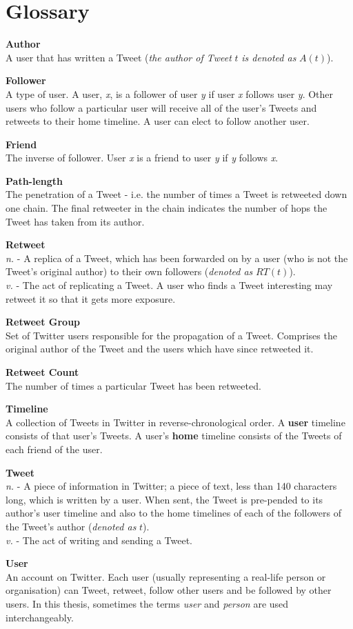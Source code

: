 \chapter*{Glossary} 

{\bf Author}\\
A user that has written a Tweet  (\textit{the author of Tweet} $t$ \textit{is denoted as} $A(t)$). 

{\bf Follower}\\
A type of user. A user, \textit{x}, is a follower of user \textit{y} if user \textit{x} follows user \textit{y}. Other users who follow a particular user will receive all of the user's Tweets and retweets to their home timeline. A user can elect to follow another user.

{\bf Friend}\\
The inverse of follower. User \textit{x} is a friend to user \textit{y} if \textit{y} follows \textit{x}.

{\bf Path-length}\\
The penetration of a Tweet - i.e. the number of times a Tweet is retweeted down one chain. The final retweeter in the chain indicates the number of hops the Tweet has taken from its author.
			
{\bf Retweet}\\
\textit{n.} - A replica of a Tweet, which has been forwarded on by a user (who is not the Tweet's original author) to their own followers (\textit{denoted as} $RT(t)$). \\
\textit{v.} - The act of replicating a Tweet. A user who finds a Tweet interesting may retweet it so that it gets more exposure.
									
{\bf Retweet Group}\\
Set of Twitter users responsible for the propagation of a Tweet. Comprises the original author of the Tweet and the users which have since retweeted it.

{\bf Retweet Count}\\
The number of times a particular Tweet has been retweeted.

{\bf Timeline}\\
A collection of Tweets in Twitter in reverse-chronological order. A \textbf{user} timeline consists of that user's Tweets. A user's \textbf{home} timeline consists of the Tweets of each friend of the user.

{\bf Tweet}\\
\textit{n.} - A piece of information in Twitter; a piece of text, less than 140 characters long, which is written by a user. When sent, the Tweet is pre-pended to its author's user timeline and also to the home timelines of each of the followers of the Tweet's author (\textit{denoted as} $t$).\\
\textit{v.} - The act of writing and sending a Tweet.

{\bf User}\\
An account on Twitter. Each user (usually representing a real-life person or organisation) can Tweet, retweet, follow other users and be followed by other users. In this thesis, sometimes the terms \textit{user} and \textit{person} are used interchangeably.